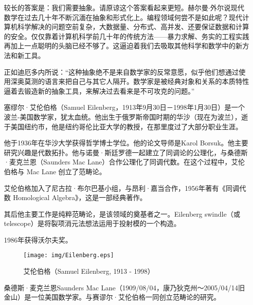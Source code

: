 \documentclass{article}
\begin{document}
较长的答案是：我们需要抽象。请原谅这个答案看起来更短。赫尔曼$\cdot$外尔说现代数学在过去几十年不断沉湎在抽象和形式化上。编程领域何尝不是如此呢？现代计算机科学解决的问题空前复杂，大数据量、分布式、高并发、还要保证数据和计算的安全。仅仅靠着计算机科学前几十年的传统方法——暴力求解、务实的工程实践再加上一点聪明的头脑已经不够了。这逼迫着我们去吸取其他科学和数学中的新方法和新工具。

正如迪厄多内所说：“这种抽象绝不是来自数学家的反常意愿，似乎他们想通过使用深奥莫测的语言来把自己与其它人隔开。数学家是被经典对象和关系的本质特性逼着去锻造新的抽象工具，来解决过去看来是不可攻克的问题。”\cite{Dieudonne1987}

塞缪尔·艾伦伯格（Samuel Eilenberg，1913年9月30日－1998年1月30日）是一个波兰-美国数学家，犹太血统。他出生于俄罗斯帝国时期的华沙（现在为波兰），逝于美国纽约市，他是纽约哥伦比亚大学的教授，在那里度过了大部分职业生涯。

他于1936年在华沙大学获得哲学博士学位。他的论文导师是Karol Borsuk。他主要研究兴趣是代数拓扑。他与诺曼·斯廷罗德一起建立了同调论的公理化，与桑德斯·麦克兰恩（Saunders Mac Lane）合作公理化了同调代数。在这个过程中，艾伦伯格与 Mac Lane 创立了范畴论。

艾伦伯格加入了尼古拉·布尔巴基小组，与昂利·嘉当合作，1956年著有《同调代数 Homological Algebra》，这是一部经典著作。

其后他主要工作是纯粹范畴论，是该领域的奠基者之一。Eilenberg swindle（或 telescope）是将裂项消元法想法运用于投射模的一个构造。

1986年获得沃尔夫奖。

\begin{wrapfigure}{R}{0.3\textwidth}
 \centering
 \texttt{[image: img/Eilenberg.eps]}
 \captionsetup{labelformat=empty}
 \caption{艾伦伯格（Samuel Eilenberg, 1913 - 1998）}
 \label{fig:Pythagoras}
\end{wrapfigure}

桑德斯·麦克兰恩Saunders Mac Lane（1909/08/04，康乃狄克州～2005/04/14旧金山）是一位美国数学家。与赛谬尔·艾伦伯格一同创立范畴论的研究。
\end{document}
